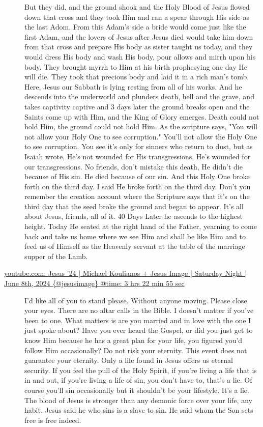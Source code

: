 \documentclass[11pt]{article}
\begin{document}
\begin{description}
But they did, and the ground
shook and the Holy Blood of Jesus flowed
down that cross and they took
Him and ran a spear through His side as
the last Adom. From this Adam's side a bride would come
just like the first Adam, and the lovers of Jesus after Jesus
died would take him down from that cross
and prepare His body as sister taught us
today, and they would dress His
body and wash His
body, pour allows and mirrh upon his body.
They brought myrrh to Him at his
birth prophesying one day He will
die. They took that precious body and
laid it in a rich man's
tomb. Here, Jesus our Sabbath is
lying resting from all of his works.
And he descends into the underworld and
plunders death, hell and the
grave, and takes captivity captive and 3
days later the ground breaks open and
the Saints come up with
Him, and the King of Glory
emerges. Death could not hold Him, the
ground could not hold Him. As the
scripture says, "You will not allow your
Holy One to see
corruption." You'll not allow the Holy One
to see corruption.
You see it's only for sinners who
return to dust, but as Isaiah wrote, He's not
wounded for His
transgressions, He's wounded for our
transgressions. No friends, don't mistake
this death, He didn't die because of His
sin. He died because of our sin. And this
Holy One broke forth on the third day. I
said He broke forth on the third day.
Don't you remember the creation account where the
Scripture says that it's on the third
day that the seed broke the
ground and began to appear. It's all
about Jesus, friends, all of it. 40 Days Later
he ascends to the highest
height. Today He seated at the right hand
of the Father, yearning to come
back and take us
home where we see Him and shall be like
Him and to feed us
of Himself as the Heavenly
servant at the table of the marriage
supper of the Lamb.

\item[{\href{https://youtube.com/watch?v=mLSCu4pKmu4\&t=12175}{youtube.com: Jesus '24 | Michael Koulianos + Jesus Image | Saturday Night | June 8th, 2024 \{@jesusimage\} @time: 3 hrs 22 min 55 sec}}] I'd like all of you to stand
please. Without anyone moving.
Please close your
eyes. There are no altar calls in the
Bible. I doesn't matter if you've
been to one. What matters is are you married and
in love with the one I just spoke
about? Have you ever heard the
Gospel, or did you just get to know Him
because he has a great plan for your
life, you figured you'd follow Him
occasionally? Do not risk your
eternity. This event does not guarantee
your eternity. Only a life found in
Jesus offers us eternal security. If you feel the pull of the
Holy Spirit, if you're living a life that
is in and out, if you're living a life of
sin, you don't have to, that's a
lie. Of course you'll sin occasionally
but it shouldn't be your
lifestyle. It's a
lie. The blood of Jesus is stronger than
any demonic force over your
life, any habit. Jesus said he who sins is a slave
to sin. He said whom the Son sets free is
free indeed.


\end{description}
\end{document}
